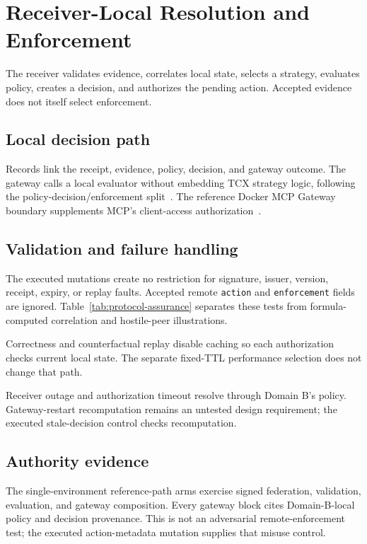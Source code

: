\section{Receiver-Local Resolution and Enforcement}

The receiver validates evidence, correlates local state, selects a strategy, evaluates policy, creates a decision, and authorizes the pending action. Accepted evidence does not itself select enforcement.

\subsection{Local decision path}

Records link the receipt, evidence, policy, decision, and gateway outcome. The gateway calls a local evaluator without embedding TCX strategy logic, following the policy-decision/enforcement split~\cite{nistZta}. The reference Docker MCP Gateway boundary supplements MCP's client-access authorization~\cite{mcpAuthorization}.

\subsection{Validation and failure handling}

The \ValidatorMutationCases{} executed mutations create no restriction for signature, issuer, version, receipt, expiry, or replay faults. Accepted remote \texttt{action} and \texttt{enforcement} fields are ignored. Table~\ref{tab:protocol-assurance} separates these tests from formula-computed correlation and hostile-peer illustrations.

Correctness and counterfactual replay disable caching so each authorization checks current local state. The separate fixed-TTL performance selection does not change that path.

Receiver outage and authorization timeout resolve through Domain B's policy. Gateway-restart recomputation remains an untested design requirement; the executed stale-decision control checks recomputation.

\subsection{Authority evidence}

The \PhysicalArms{} single-environment reference-path arms exercise signed federation, validation, evaluation, and gateway composition. Every gateway block cites Domain-B-local policy and decision provenance. This is not an adversarial remote-enforcement test; the executed action-metadata mutation supplies that misuse control.
